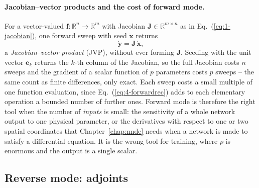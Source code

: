 \paragraph{Jacobian--vector products and the cost of forward mode.}
For a vector-valued $\bm{f}:\mathbb{R}^{n}\to\mathbb{R}^{m}$ with Jacobian
$\bm{J}\in\mathbb{R}^{m\times n}$ as in Eq.~(\ref{eq:1-jacobian}), one forward
sweep with seed $\dot{\bm{x}}$ returns
\begin{equation}
  \dot{\bm{y}} = \bm{J}\,\dot{\bm{x}} ,
  \label{eq:4-jvp}
\end{equation}
a \emph{Jacobian--vector product} (JVP), without ever forming $\bm{J}$.
Seeding with the unit vector $\bm{e}_k$ returns the $k$-th column of the
Jacobian, so the full Jacobian costs $n$ sweeps and the gradient of a scalar
function of $p$ parameters costs $p$ sweeps -- the same count as finite
differences, only exact.  Each sweep costs a small multiple of one function
evaluation, since Eq.~(\ref{eq:4-forwardrec}) adds to each elementary
operation a bounded number of further ones.  Forward mode is therefore the
right tool when the number of \emph{inputs} is small: the sensitivity of a
whole network output to one physical parameter, or the derivatives with
respect to one or two spatial coordinates that Chapter~\ref{chap:nnde} needs
when a network is made to satisfy a differential equation.  It is the wrong
tool for training, where $p$ is enormous and the output is a single scalar.

\subsection{Reverse mode: adjoints}
\label{sec:adreverse}

